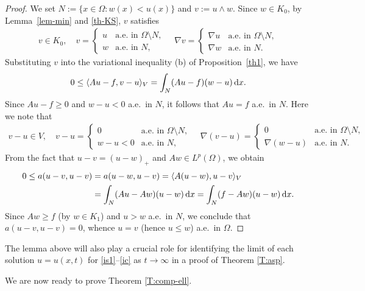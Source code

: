 \documentclass[reqno,10pt]{amsart}
\begin{document}
\begin{proof}
We set $N:=\{x\in \Omega \colon w(x)<u(x)\}$ and $v:= u \wedge w$.
Since $w \in K_0$, by Lemma~\ref{lem-min} and \eqref{th-KS}, $v$ satisfies 
\begin{align*}
v\in K_0,
\quad
v= \begin{cases}
    u&\mbox{a.e.~in }\Omega\setminus N,\\
    w&\mbox{a.e.~in }N,
   \end{cases}
\quad
\nabla v=\begin{cases}
	  \nabla u&\mbox{a.e.~in }\Omega\setminus N,\\
\nabla w&\mbox{a.e.~in }N.
	 \end{cases}
\end{align*}
Substituting $v$ into the variational inequality (b) of Proposition~\ref{th1},
we have 
\begin{align*}
0\le \langle Au-f,v-u\rangle_V 
=\int_N (Au-f)(w-u)\,{\text{\rm d}} x.
\end{align*}
Since $Au - f \geq 0$ and $w-u<0$ a.e.~in $N$, it follows that
$Au=f$ a.e.~in $N$. Here we note that
\begin{align*}
v-u\in V,
\quad
v-u=\begin{cases}
     0&\mbox{a.e.~in }\Omega\setminus N,\\
     w- u <0&\mbox{a.e.~in }N,
    \end{cases}
\quad
\nabla (v-u)=\begin{cases}
	      0&\mbox{a.e.~in }\Omega\setminus N,\\
	      \nabla (w-u)&\mbox{a.e.~in }N.
	     \end{cases}
\end{align*}
From the fact that $u-v=(u-w)_+$ and $Aw \in L^p(\Omega)$, we obtain
\begin{align*}
0 \leq a(u-v,u-v)
&=a(u-w, u-v)
=
\langle A(u-w),u-v\rangle_V \\
&=
\int_N (Au-Aw)(u-w)\,{\text{\rm d}} x
=
\int_N (f-Aw)(u-w)\,{\text{\rm d}} x.
\end{align*}
Since $Aw \geq f$ (by $w \in K_1$) and $u > w$ a.e.~in $N$, we conclude
 that $a(u-v,u-v) = 0$, whence $u=v$ (hence $u \le w$) a.e.~in
 $\Omega$.
\end{proof}

The lemma above will also play a crucial role for identifying the
limit of each solution $u = u(x,t)$ for \eqref{is1}--\eqref{ic} as $t
\to \infty$ in a proof of Theorem \ref{T:asp}.

We are now ready to prove Theorem \ref{T:comp-ell}.
\end{document}

